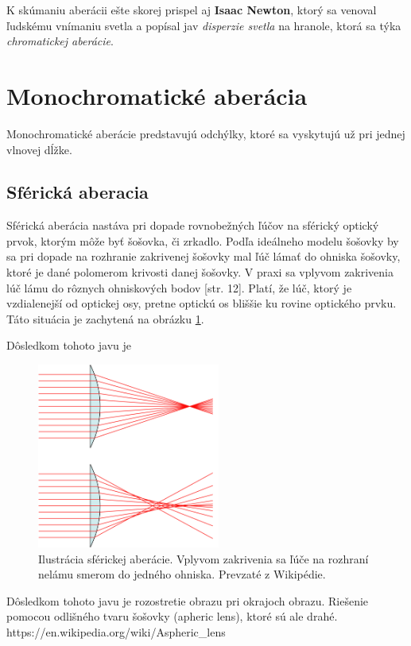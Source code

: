 K skúmaniu aberácii ešte skorej prispel aj \textbf{Isaac Newton}, ktorý sa venoval ľudskému vnímaniu svetla a
popísal jav \textit{disperzie svetla} na hranole, ktorá sa týka \textit{chromatickej aberácie}. \cite{elert}

\section{Monochromatické aberácia}
Monochromatické aberácie predstavujú odchýlky, ktoré sa vyskytujú už pri jednej vlnovej dĺžke.
\subsection{Sférická aberacia}
Sférická aberácia nastáva pri dopade rovnobežných ľúčov na sférický optický prvok, ktorým môže byť
šošovka, či zrkadlo. 
Podľa ideálneho modelu šošovky by sa pri dopade na rozhranie zakrivenej šošovky mal ľúč lámať do ohniska šošovky, ktoré
je dané polomerom krivosti danej šošovky. V praxi sa vplyvom zakrivenia lúč lámu do rôznych
ohniskových bodov \cite{elisa}[str. 12]. Platí, že lúč, ktorý je vzdialenejší od optickej osy, pretne optickú os bliššie
ku rovine optického prvku. Táto situácia je zachytená na obrázku \ref{saill}.

Dôsledkom tohoto javu je 

\begin{figure}[h]
\centering
\label{saill}
\includegraphics[width=6cm]{obrazky-figures/sphericalAberrationWikipedia.png}
\caption{Ilustrácia sférickej aberácie. Vplyvom zakrivenia sa ľúče na rozhraní nelámu smerom
    do jedného ohniska. Prevzaté z Wikipédie\cite{sphericalAberrationWiki}.}
\end{figure}

Dôsledkom tohoto javu je rozostretie obrazu pri okrajoch obrazu.  
Riešenie pomocou odlišného tvaru šošovky (apheric lens), ktoré sú ale drahé. https://en.wikipedia.org/wiki/Aspheric\_lens

